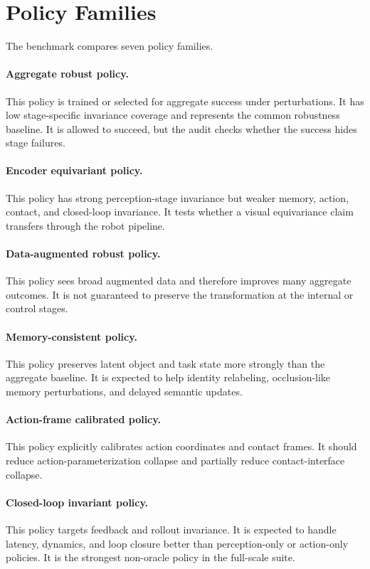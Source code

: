 \documentclass{article}
\begin{document}
\section{Policy Families}

The benchmark compares seven policy families.

\paragraph{Aggregate robust policy.}
This policy is trained or selected for aggregate success under perturbations. It has low stage-specific invariance coverage and represents the common robustness baseline. It is allowed to succeed, but the audit checks whether the success hides stage failures.

\paragraph{Encoder equivariant policy.}
This policy has strong perception-stage invariance but weaker memory, action, contact, and closed-loop invariance. It tests whether a visual equivariance claim transfers through the robot pipeline.

\paragraph{Data-augmented robust policy.}
This policy sees broad augmented data and therefore improves many aggregate outcomes. It is not guaranteed to preserve the transformation at the internal or control stages.

\paragraph{Memory-consistent policy.}
This policy preserves latent object and task state more strongly than the aggregate baseline. It is expected to help identity relabeling, occlusion-like memory perturbations, and delayed semantic updates.

\paragraph{Action-frame calibrated policy.}
This policy explicitly calibrates action coordinates and contact frames. It should reduce action-parameterization collapse and partially reduce contact-interface collapse.

\paragraph{Closed-loop invariant policy.}
This policy targets feedback and rollout invariance. It is expected to handle latency, dynamics, and loop closure better than perception-only or action-only policies. It is the strongest non-oracle policy in the full-scale suite.
\end{document}
